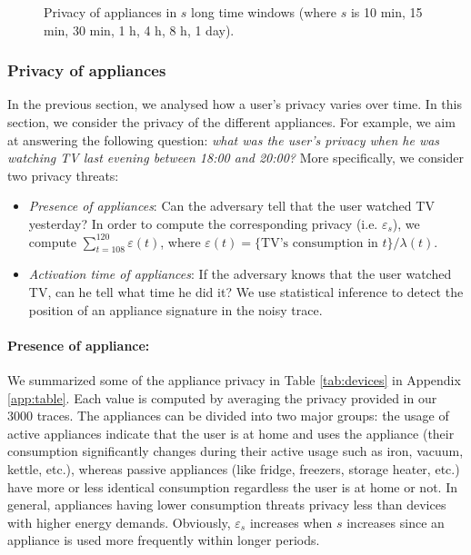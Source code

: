 \documentclass[11pt,a4paper]{article}
\theoremstyle{plain}
\theoremstyle{plain}
\theoremstyle{plain}
\theoremstyle{plain}
\theoremstyle{nonumberplain} \theoremseparator{}
\begin{document}
\begin{figure*}[ht]
\centering
{}
\caption{Privacy of appliances in $s$ long time windows (where $s$ is 10 min, 15 min, 30 min, 1 h, 4 h, 8 h, 1 day).}
\end{figure*}

\subsubsection{Privacy of appliances}
In the previous section, we analysed how a user's privacy  varies over time. In this section, we consider the privacy of the different appliances. For example, we aim at answering the following question: {\em what was the user's privacy when he was watching TV last evening between 18:00 and 20:00?} More specifically, we consider two privacy threats: 
\begin{itemize}
\item \emph{Presence of appliances}: Can the adversary tell that the user watched TV yesterday?
In order to compute the corresponding privacy (i.e. $\varepsilon_s$), we compute $\sum_{t=108}^{120} \varepsilon(t)$, where  $\varepsilon(t) = \{\text{TV's consumption in $t$}\}/\lambda(t)$.
\item \emph{Activation time of appliances}: If the adversary knows that the user watched TV, can he tell what time he did it?
We use statistical inference to detect the position of an appliance signature in the noisy trace. 
\end{itemize}

\paragraph{Presence of appliance:} We summarized some of the appliance privacy in Table \ref{tab:devices} in Appendix \ref{app:table}. Each value is computed by averaging the privacy provided in our 3000 traces.
The appliances can be divided into two major groups: the usage of active appliances indicate that the user is at home and uses the appliance (their consumption significantly changes during their active usage such as iron, vacuum, kettle, etc.), whereas passive appliances (like fridge, freezers, storage heater, etc.) have more or less identical consumption regardless the user is at home or not. 
In general, appliances having lower consumption threats privacy less than devices with higher energy demands.  Obviously, $\varepsilon_s$ increases when $s$ increases since an appliance is used more frequently within longer periods.
\end{document}
